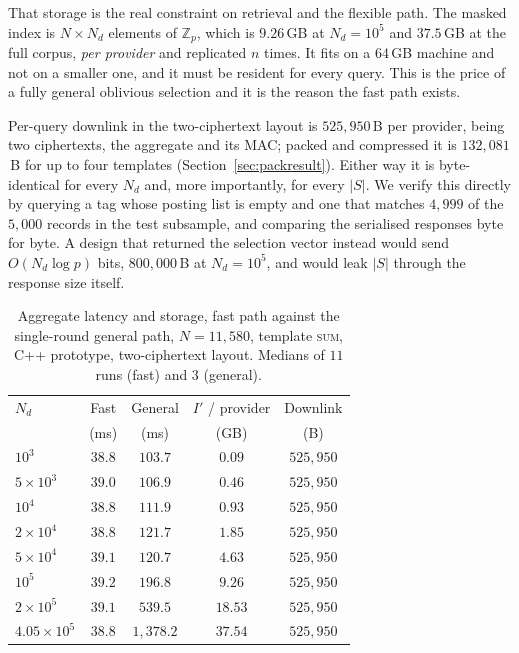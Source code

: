 \documentclass[a4paper,fleqn]{cas-sc}
\begin{document}
That storage is the real constraint on retrieval and the flexible path. The
masked index is
$N\times N_d$ elements of $\mathbb{Z}_p$, which is $9.26$\,GB at $N_d=10^5$
and $37.5$\,GB at the full corpus, \emph{per provider} and replicated $n$
times. It fits on a $64$\,GB machine and not on a smaller one, and it must be
resident for every query. This is the price of a fully general oblivious
selection and it is the reason the fast path exists.

Per-query downlink in the two-ciphertext layout is $525{,}950$\,B per provider,
being two ciphertexts, the aggregate and its MAC; packed and compressed it is
$132{,}081$\,B for up to four templates (Section~\ref{sec:packresult}). Either
way it is byte-identical for every $N_d$ and, more importantly, for every
$|S|$. We verify this directly by querying a tag whose
posting list is empty and one that matches $4{,}999$ of the $5{,}000$ records
in the test subsample, and comparing the serialised responses byte for byte. A
design that returned the selection vector instead would send $O(N_d\log p)$
bits, $800{,}000$\,B at $N_d=10^5$, and would leak $|S|$ through the response
size itself.

\begin{table}[pos=htbp]
\caption{Aggregate latency and storage, fast path against the single-round
general path, $N=11{,}580$, template \textsc{sum}, C++ prototype,
two-ciphertext layout. Medians of $11$ runs (fast) and $3$ (general).}
\label{tab:compute}
\centering
\footnotesize
\setlength{\tabcolsep}{3pt}
\renewcommand{\arraystretch}{1.2}
\begin{tabular*}{\tblwidth}{@{\extracolsep{\fill}}lcccc@{}}
\toprule
$N_d$ & Fast & General & $I'$ / provider & Downlink \\
      & (ms) & (ms)     & (GB)            & (B) \\
\midrule
$10^3$             & $38.8$ & $103.7$   & $0.09$  & $525{,}950$ \\
$5\times10^3$      & $39.0$ & $106.9$   & $0.46$  & $525{,}950$ \\
$10^4$             & $38.8$ & $111.9$   & $0.93$  & $525{,}950$ \\
$2\times10^4$      & $38.8$ & $121.7$   & $1.85$  & $525{,}950$ \\
$5\times10^4$      & $39.1$ & $120.7$   & $4.63$  & $525{,}950$ \\
$10^5$             & $39.2$ & $196.8$   & $9.26$  & $525{,}950$ \\
$2\times10^5$      & $39.1$ & $539.5$   & $18.53$ & $525{,}950$ \\
$4.05\times10^5$   & $38.8$ & $1{,}378.2$ & $37.54$ & $525{,}950$ \\
\bottomrule
\end{tabular*}
\end{table}
\end{document}
